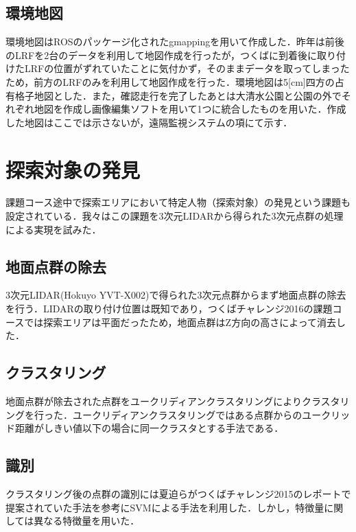 \documentclass[10pt,a4paper]{jarticle}
\begin{document}
\subsection{環境地図}
環境地図はROSのパッケージ化されたgmappingを用いて作成した．昨年は前後のLRFを2台のデータを利用して地図作成を行ったが，つくばに到着後に取り付けたLRFの位置がずれていたことに気付かず，そのままデータを取ってしまったため，前方のLRFのみを利用して地図作成を行った．環境地図は5[cm]四方の占有格子地図とした．また，確認走行を完了したあとは大清水公園と公園の外でそれぞれ地図を作成し画像編集ソフトを用いて1つに統合したものを用いた．作成した地図はここでは示さないが，遠隔監視システムの項にて示す．



\section{探索対象の発見}
課題コース途中で探索エリアにおいて特定人物（探索対象）の発見という課題も設定されている．我々はこの課題を3次元LIDARから得られた3次元点群の処理による実現を試みた．

\subsection{地面点群の除去}
3次元LIDAR(Hokuyo YVT-X002)で得られた3次元点群からまず地面点群の除去を行う．LIDARの取り付け位置は既知であり，つくばチャレンジ2016の課題コースでは探索エリアは平面だったため，地面点群はZ方向の高さによって消去した．
\subsection{クラスタリング}
地面点群が除去された点群をユークリディアンクラスタリングによりクラスタリングを行った．ユークリディアンクラスタリングではある点群からのユークリッド距離がしきい値以下の場合に同一クラスタとする手法である．
\subsection{識別}
クラスタリング後の点群の識別には夏迫らがつくばチャレンジ2015のレポートで提案されていた手法を参考にSVMによる手法を利用した．しかし，特徴量に関しては異なる特徴量を用いた．
\end{document}
